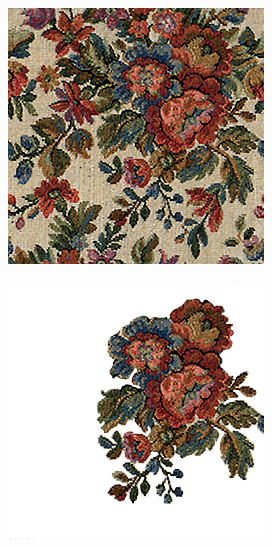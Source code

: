 \begin{figure}[]
\begin{subfigure}{\textwidth}
        \begin{subfigure}{0.24\textwidth}
            \centering
            \includegraphics[width=\textwidth]{images/04-experiment01/flowers/target.jpg}
            \caption*{}
        \end{subfigure}
        \hfill
        \begin{subfigure}{0.24\textwidth}
            \centering
            \includegraphics[width=\textwidth]{images/04-experiment01/flowers/some_bg.jpg}

\end{subfigure}
\end{subfigure}
\end{figure}
